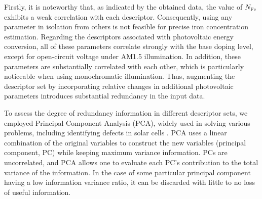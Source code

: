 \documentclass[a4paper,fleqn]{cas-sc}
\begin{document}
Firstly, it is noteworthy that, as indicated by the obtained data,
the value of $N_\mathrm{Fe}$ exhibits a weak correlation with each descriptor.
Consequently, using any parameter in isolation from others is not feasible for precise iron concentration estimation.
Regarding the descriptors associated with photovoltaic energy conversion,
all of these parameters correlate strongly with the base doping level, except for open-circuit voltage under AM1.5 illumination.
In addition, these parameters are substantially correlated with each
other, which is particularly noticeable when using monochromatic illumination.
Thus,  augmenting the descriptor set by incorporating relative changes in additional
photovoltaic parameters introduces substantial redundancy in the input data.


To assess the degree of redundancy information in different descriptor sets, we employed Principal Component Analysis (PCA),
widely used in solving various problems, including identifying defects in solar cells \cite{Fadhel2019}.
PCA uses a linear combination of the original variables to construct the new variables (principal component, PC) while keeping maximum variance information.
PCs are uncorrelated, and PCA allows one to evaluate each PC’s contribution to the total variance of the information.
In the case of some particular principal component having a low information variance ratio, it can be discarded with little to no loss of useful information.
\end{document}
